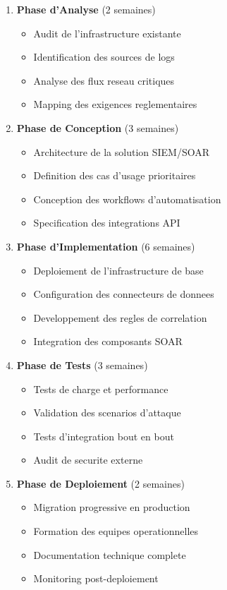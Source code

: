 \begin{enumerate}
    \item \textbf{Phase d'Analyse} (2 semaines)
          \begin{itemize}
              \item Audit de l'infrastructure existante
              \item Identification des sources de logs
              \item Analyse des flux reseau critiques
              \item Mapping des exigences reglementaires
          \end{itemize}

    \item \textbf{Phase de Conception} (3 semaines)
          \begin{itemize}
              \item Architecture de la solution SIEM/SOAR
              \item Definition des cas d'usage prioritaires
              \item Conception des workflows d'automatisation
              \item Specification des integrations API
          \end{itemize}

    \item \textbf{Phase d'Implementation} (6 semaines)
          \begin{itemize}
              \item Deploiement de l'infrastructure de base
              \item Configuration des connecteurs de donnees
              \item Developpement des regles de correlation
              \item Integration des composants SOAR
          \end{itemize}

    \item \textbf{Phase de Tests} (3 semaines)
          \begin{itemize}
              \item Tests de charge et performance
              \item Validation des scenarios d'attaque
              \item Tests d'integration bout en bout
              \item Audit de securite externe
          \end{itemize}

    \item \textbf{Phase de Deploiement} (2 semaines)
          \begin{itemize}
              \item Migration progressive en production
              \item Formation des equipes operationnelles
              \item Documentation technique complete
              \item Monitoring post-deploiement
          \end{itemize}
\end{enumerate}

